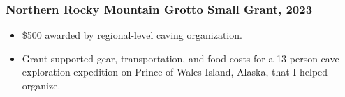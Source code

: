 \documentclass{article}
\begin{document}
		\subsubsection*{Northern Rocky Mountain Grotto Small Grant, 2023}
			\begin{itemize}
				\item \$500 awarded by regional-level caving organization.
				\item Grant supported gear, transportation, and food costs for a 13 person cave exploration expedition on Prince of Wales Island, Alaska, that I helped organize.
			\end{itemize}

\end{document}
